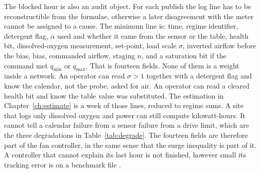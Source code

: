 The blocked hour is also an audit object. For each publish the log line has to be reconstructible from the formulae, otherwise a later disagreement with the meter cannot be assigned to a cause. The minimum line is: time, regime identifier, detergent flag, $\alpha$ used and whether it came from the sensor or the table, health bit, dissolved-oxygen measurement, set-point, load scale $\sigma$, inverted airflow before the bias, bias, commanded airflow, staging $n$, and a saturation bit if the command met $q_{\min}$ or $q_{\max}$. That is fourteen fields. None of them is a weight inside a network. An operator can read $\sigma>1$ together with a detergent flag and know the calendar, not the probe, asked for air. An operator can read a cleared health bit and know the table value was substituted. The estimation in Chapter~\ref{ch:estimate} is a week of those lines, reduced to regime sums. A site that logs only dissolved oxygen and power can still compute kilowatt-hours. It cannot tell a calendar failure from a sensor failure from a drive limit, which are the three degradations in Table~\ref{tab:degrade}. The fourteen fields are therefore part of the fan controller, in the same sense that the surge inequality is part of it. A controller that cannot explain its last hour is not finished, however small its tracking error is on a benchmark file \cite{qin2003mpc,obrien2011,iratni2019,corominas2018}.
